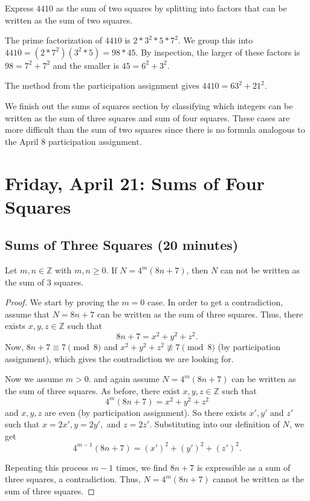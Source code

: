 \documentclass[letterpaper, 11 pt]{article}
\begin{document}
\begin{example}
 Express $4410$ as the sum of two squares by splitting into factors that can be written as the sum of two squares.
 
 The prime factorization of $4410$ is $2*3^2*5*7^2$. We group this into $4410=({2}*{7}^2)({3}^2*{5})={98}*{45}.$ By inspection, the larger of these factors is ${98}={7}^2+{7}^2$ and the smaller is ${45}={6}^2+{3}^2$.
 
 The method from the participation assignment gives $4410={63}^2+{21}^2$.
\end{example}
We finish out the sums of squares section by classifying which integers can be written as the sum of three squares and sum of four squares. These cases are more difficult than the sum of two squares since there is no formula analogous to the April 8 participation assignment.
\section{Friday, April 21: Sums of Four Squares}
\subsection{Sums of Three Squares (20 minutes)}
\begin{thm}
Let $m,n\in\mathbb{Z}$ with $m,n\geq0$. If $N=4^m(8n+7)$, then $N$ can not be written as the sum of $3$ squares.
\end{thm}
\begin{proof}
 We start by proving the $m=0$ case. In order to get a contradiction, assume that $N=8n+7$ can be written as the sum of three squares. Thus, there exists $x,y,z\in\mathbb{Z}$ such that \[8n+7=x^2+y^2+z^2.\]
 Now, $8n+7\equiv 7\pmod8$ and $x^2+y^2+z^2\not\equiv7\pmod 8$ (by participation assignment), which gives the contradiction we are looking for.

Now we assume $m>0$. and again assume $N=4^m(8n+7)$ can be written as the sum of three squares. As before, there exist $x,y,z\in\mathbb{Z}$ such that \[4^m(8n+7)=x^2+y^2+z^2\] and $x,y,z$ are even (by participation assignment). So there exists $x',y'$ and $z'$ such that $x=2x', y=2y',$ and $z=2z'$. Substituting into our definition of $N$, we get \[4^{m-1}(8n+7)=(x')^2+(y')^2+(z')^2.\]

Repeating  this process $m-1$ times, we find $8n+7$ is expressible as a sum of three squares, a contradiction. Thus, $N=4^m(8n+7)$ cannot be written as the sum of three squares.
\end{proof}
\end{document}

